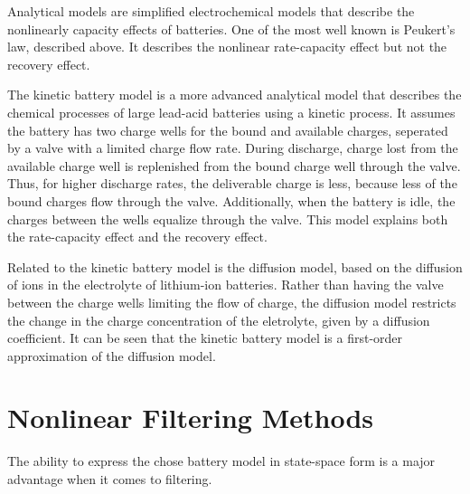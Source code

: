 Analytical models are simplified electrochemical models that describe the nonlinearly capacity effects of batteries. One of the most well known is Peukert's law, described above. It describes the nonlinear rate-capacity effect but not the recovery effect.

The kinetic battery model is a more advanced analytical model that describes the chemical processes of large lead-acid batteries using a kinetic process\cite{manwell93}. It assumes the battery has two charge wells for the bound and available charges, seperated by a valve with a limited charge flow rate. During discharge, charge lost from the available charge well is replenished from the bound charge well through the valve. Thus, for higher discharge rates, the deliverable charge is less, because less of the bound charges flow through the valve. Additionally, when the battery is idle, the charges between the wells equalize through the valve. This model explains both the rate-capacity effect and the recovery effect.

Related to the kinetic battery model is the diffusion model, based on the diffusion of ions in the electrolyte of lithium-ion batteries\cite{rakhmatov01}. Rather than having the valve between the charge wells limiting the flow of charge, the diffusion model restricts the change in the charge concentration of the eletrolyte, given by a diffusion coefficient. It can be seen that the kinetic battery model is a first-order approximation of the diffusion model\cite{jongerden09}.


\section{Nonlinear Filtering Methods}

The ability to express the chose battery model in state-space form is a major advantage when it comes to filtering. %
